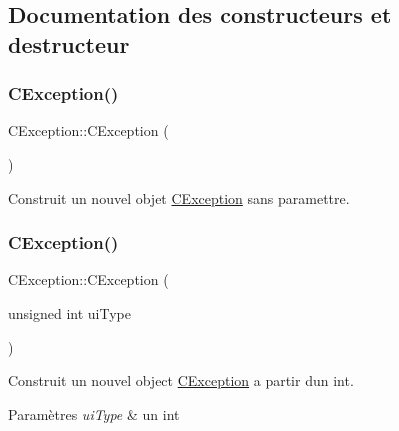 \subsection{Documentation des constructeurs et destructeur}
\mbox{\label{classCException_a193ebfae477160a82d6e44299af4ed10}} 
\subsubsection{\texorpdfstring{C\+Exception()}{CException()}\hspace{0.1cm}{\footnotesize\ttfamily [1/3]}}
{\footnotesize\ttfamily C\+Exception\+::\+C\+Exception (\begin{DoxyParamCaption}{ }\end{DoxyParamCaption})}



Construit un nouvel objet \hyperlink{classCException}{C\+Exception} sans paramettre. 

\mbox{\label{classCException_a84f4e7fa075fdd466c5b203048205a6b}} 
\subsubsection{\texorpdfstring{C\+Exception()}{CException()}\hspace{0.1cm}{\footnotesize\ttfamily [2/3]}}
{\footnotesize\ttfamily C\+Exception\+::\+C\+Exception (\begin{DoxyParamCaption}\item[{unsigned int}]{ui\+Type }\end{DoxyParamCaption})}



Construit un nouvel object \hyperlink{classCException}{C\+Exception} a partir d\textquotesingle{}un int. 


\begin{DoxyParams}{Paramètres}
{\em ui\+Type} & un int \\
\hline
\end{DoxyParams}
\mbox{\label{classCException_aab8f2fdcdc5e4390e66a32c8706b9df8}} 
